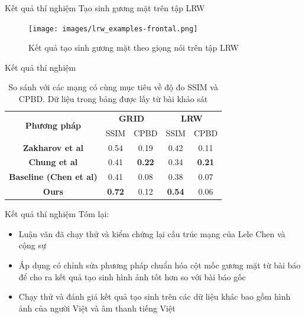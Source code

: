 \begin{frame}{Kết quả thí nghiệm}
Tạo sinh gương mặt trên tập LRW
\begin{figure}[H]
    \centering
    \texttt{[image: images/lrw\_examples-frontal.png]}
    \caption{Kết quả tạo sinh gương mặt theo giọng nói trên tập LRW}
\end{figure}
\end{frame}

\begin{frame}{Kết quả thí nghiệm}
\begin{table}[h]
    \centering
    \begin{tabular}{c | c | c | c | c}
    \hline 
    \multirow{2}{*}{\textbf{Phương pháp}} & \multicolumn{2}{c|}{\textbf{GRID}} & \multicolumn{2}{c}{\textbf{LRW}}\\
    \cline{2-5}
    & SSIM & CPBD & SSIM & CPBD\\
    \hline
    \textbf{Zakharov et al \cite{zakharov}} & 0.54 & 0.19 & 0.42 & 0.11 \\
    \textbf{Chung et al \cite{chung}} & 0.41 & \textbf{0.22} & 0.34 & \textbf{0.21} \\
    \textbf{Baseline (Chen et al) \cite{chen2019}} & 0.41 & 0.08 & 0.38 & 0.07 \\
    \hline
    \hline
    \textbf{Ours} & \textbf{0.72} & 0.12 & \textbf{0.54} & 0.06 \\
    \hline
    \end{tabular}
    \caption{So sánh với các mạng có cùng mục tiêu về độ đo SSIM và CPBD. Dữ liệu trong bảng được lấy từ bài khảo sát \cite{chen_survey}}
    \label{table:metrics_result}
\end{table}
\end{frame}

\begin{frame}{Kết quả thí nghiệm}
Tóm lại:
\begin{itemize}
    \item Luận văn đã chạy thử và kiểm chứng lại cấu trúc mạng của Lele Chen và cộng sự \cite{chen2020}
    \item Áp dụng có chỉnh sửa phương pháp chuẩn hóa cột mốc gương mặt từ bài báo \cite{gen_face_landmark} để cho ra kết quả tạo sinh hình ảnh tốt hơn so với bài báo gốc
    \item Chạy thử và đánh giá kết quả tạo sinh trên các dữ liệu khác bao gồm hình ảnh của người Việt và âm thanh tiếng Việt
\end{itemize}
\end{frame}
